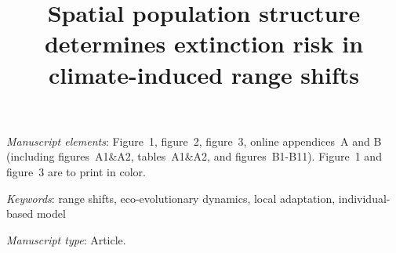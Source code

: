 \documentclass[11pt]{article}
\title{Spatial population structure determines extinction risk in climate-induced range shifts}
\date{}
\begin{document}
\maketitle






\bigskip

\textit{Manuscript elements}: Figure~1, figure~2, figure~3, online appendices~A and B (including figures~A1\&A2,  tables~A1\&A2, and figures~B1-B11). Figure~1 and figure~3 are to print in color.

\bigskip

\textit{Keywords}: range shifts, eco-evolutionary dynamics, local adaptation, individual-based model

\bigskip

\textit{Manuscript type}: Article. %

\bigskip


\linenumbers{}
\modulolinenumbers[3]

\newpage{}
\end{document}
